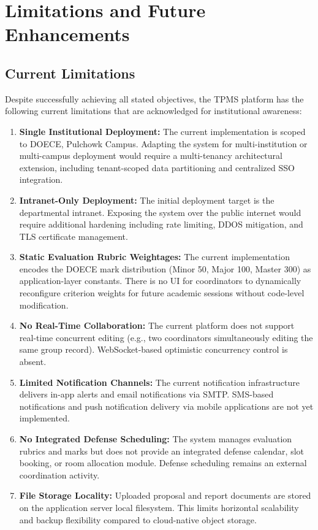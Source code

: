 \chapter{Limitations and Future Enhancements}

\section{Current Limitations}
Despite successfully achieving all stated objectives, the TPMS platform has the following current limitations that are acknowledged for institutional awareness:

\begin{enumerate}[label=\textbf{L\arabic*.}]
    \item \textbf{Single Institutional Deployment:} The current implementation is scoped to DOECE, Pulchowk Campus. Adapting the system for multi-institution or multi-campus deployment would require a multi-tenancy architectural extension, including tenant-scoped data partitioning and centralized SSO integration.
    
    \item \textbf{Intranet-Only Deployment:} The initial deployment target is the departmental intranet. Exposing the system over the public internet would require additional hardening including rate limiting, DDOS mitigation, and TLS certificate management.
    
    \item \textbf{Static Evaluation Rubric Weightages:} The current implementation encodes the DOECE mark distribution (Minor 50, Major 100, Master 300) as application-layer constants. There is no UI for coordinators to dynamically reconfigure criterion weights for future academic sessions without code-level modification.
    
    \item \textbf{No Real-Time Collaboration:} The current platform does not support real-time concurrent editing (e.g., two coordinators simultaneously editing the same group record). WebSocket-based optimistic concurrency control is absent.
    
    \item \textbf{Limited Notification Channels:} The current notification infrastructure delivers in-app alerts and email notifications via SMTP. SMS-based notifications and push notification delivery via mobile applications are not yet implemented.
    
    \item \textbf{No Integrated Defense Scheduling:} The system manages evaluation rubrics and marks but does not provide an integrated defense calendar, slot booking, or room allocation module. Defense scheduling remains an external coordination activity.
    
    \item \textbf{File Storage Locality:} Uploaded proposal and report documents are stored on the application server local filesystem. This limits horizontal scalability and backup flexibility compared to cloud-native object storage.
\end{enumerate}

